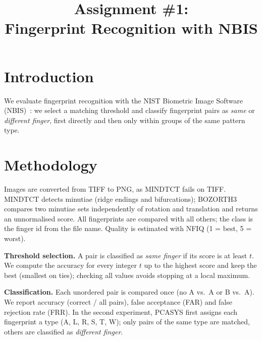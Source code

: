 \documentclass[conference]{IEEEtran}
\begin{document}
\title{Assignment \#1:\\Fingerprint Recognition with NBIS}

\author{


}

\maketitle

\section{Introduction}
We evaluate fingerprint recognition with the NIST Biometric Image Software (NBIS)~\cite{nbis}: we select a matching threshold and classify fingerprint pairs as \emph{same} or \emph{different finger}, first directly and then only within groups of the same pattern type.

\section{Methodology}
Images are converted from TIFF to PNG, as MINDTCT fails on TIFF. MINDTCT detects minutiae (ridge endings and bifurcations); BOZORTH3 compares two minutiae sets independently of rotation and translation and returns an unnormalised score. All fingerprints are compared with all others; the class is the finger id from the file name. Quality is estimated with NFIQ (1 = best, 5 = worst).

\textbf{Threshold selection.} A pair is classified as \emph{same finger} if its score is at least $t$. We compute the accuracy for every integer $t$ up to the highest score and keep the best (smallest on ties); checking all values avoids stopping at a local maximum.

\textbf{Classification.} Each unordered pair is compared once (no A vs.~A or B vs.~A). We report accuracy (correct / all pairs), false acceptance (FAR) and false rejection rate (FRR). In the second experiment, PCASYS first assigns each fingerprint a type (A, L, R, S, T, W); only pairs of the same type are matched, others are classified as \emph{different finger}.
\end{document}
